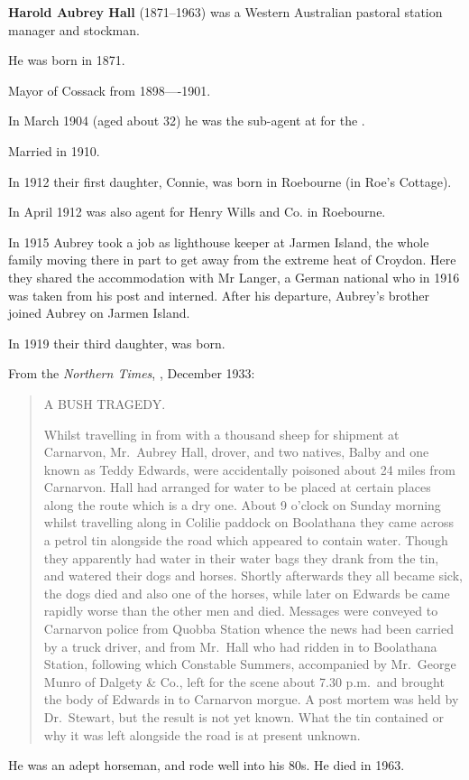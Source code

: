 
\textbf{Harold Aubrey Hall} (1871--1963) was a Western Australian pastoral station manager and stockman.

He was born in 1871.\cite{ADBWSHall}

Mayor of Cossack from 1898—-1901.\cite{CossackMayoralty}

In March 1904 (aged about 32) he was the sub-agent at  for the .\cite{1904AubreyAgent}

Married  in 1910.\cite{HAHmarriage}

In 1912 their first daughter, Connie, was born in Roebourne (in Roe's Cottage).\cite{Connie1966}

In April 1912 was also agent for Henry Wills and Co. in Roebourne.\cite{NorthernTimes1912}

In 1915 Aubrey took a job as lighthouse keeper at Jarmen Island,
the whole family moving there in part to get away from the extreme heat of Croydon.\cite{Connie1983}
Here they shared the accommodation with Mr Langer,
a German national who in 1916 was taken from his post and interned.\cite{Connie1983}
After his departure, Aubrey's brother  joined Aubrey on Jarmen Island.

In 1919 their third daughter,  was born.

From the \emph{Northern Times}, , December 1933:\cite{NorthernTimes1933}

\begin{quotation}
A BUSH TRAGEDY.

Whilst travelling in from  with a thousand sheep for shipment at Carnarvon,
Mr.\ Aubrey Hall, drover, and two natives, Balby and one known as Teddy Edwards,
were accidentally poisoned about 24 miles from Carnarvon.
Hall had arranged for water to be placed at certain places along the route which is a dry one.
About 9 o'clock on Sunday morning whilst travelling along in Colilie paddock on Boolathana
they came across a petrol tin alongside the road which appeared to contain water.
Though they apparently had water in their water bags they drank from the tin, and watered their dogs and horses.
Shortly afterwards they all became sick, the dogs died and also one of the horses,
while later on Edwards be came rapidly worse than the other men and died.
Messages were conveyed to Carnarvon police from Quobba Station whence the news had been carried by a truck driver,
and from Mr.\ Hall who had ridden in to Boolathana Station, following which Constable Summers,
accompanied by Mr.\ George Munro of Dalgety \& Co., left for the scene about 7.30 p.m.\ and
brought the body of Edwards in to Carnarvon morgue.
A post mortem was held by Dr.\ Stewart, but the result is not yet known.
What the tin contained or why it was left alongside the road is at present unknown.
\end{quotation}

He was an adept horseman, and rode well into his 80s. He died in 1963.
